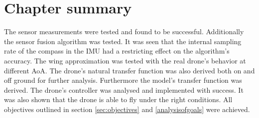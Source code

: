 \section{Chapter summary}
The sensor measurements were tested and found to be successful. Additionally the sensor fusion algorithm was tested. It was seen that the internal sampling rate of the compass in the IMU had a restricting effect on the algorithm's accuracy. The wing approximation was tested with the real drone's behavior at different AoA. The drone's natural transfer function was also derived both on and off ground for further analysis. Furthermore the model's transfer function was derived. The drone's controller was analysed and implemented with success. It was also shown that the drone is able to fly under the right conditions. All objectives outlined in section \ref{sec:objectives} and \ref{analysisofgoals} were achieved. 